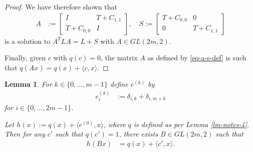 \documentclass[12pt,a4paper]{article}
\newtheorem{Lemma}{Lemma}
\begin{document}
\begin{proof}
We have therefore shown that
\begin{align}
A 
&:= 
\left[
\begin{array}{cc}
I & T + C_{1,1}
\\
T + C_{0,0} & I
\end{array}
\right],
\quad
S 
:= 
\left[
\begin{array}{cc}
T + C_{0,0} & 0
\\
0 & T + C_{1,1}
\end{array}
\right]
\label{eq-a-s-def}
\end{align}
is a solution to $A^T L A = L + S$ with $A \in GL(2 m, 2)$.

Finally, given $c$ with $q(c)=0$, the matrix $A$ as defined by \eqref{eq-a-s-def} is such that
$q(A x) = q(x) + \langle c, x \rangle$.
\end{proof}
\begin{Lemma}
\label{lm-notes-6}
For $k \in \{0,\ldots,m-1\}$ define $e^{(k)}$ by
\begin{align}
e_i^{(k)} &:= \delta_{i,k} + \delta_{i,m+k}
\label{eq-e-def} 
\end{align}
for $i \in \{0,\ldots,2 m - 1\}$.

Let $h(x) := q(x) + \langle e^{(0)}, x \rangle$, where $q$ is defined as per Lemma \ref{lm-notes-4}.
Then for any $c'$ such that $q(c')=1$, there exists $B \in GL(2 m, 2)$ such that
\begin{align}
h(B x) &= q(x) + \langle c',x \rangle.
\label{eq-h-B-x}
\end{align}
\end{Lemma}
\end{document}

